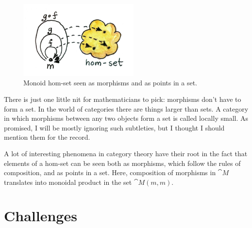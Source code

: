 \begin{figure}
\centering
\includegraphics[width=60mm]{images/monoidhomset.jpg}
\caption{Monoid hom-set seen as morphisms and as points in a set.}
\end{figure}

There is just one little nit for mathematicians to pick: morphisms don't
have to form a set. In the world of categories there are things larger
than sets. A category in which morphisms between any two objects form a
set is called locally small. As promised, I will be mostly ignoring such
subtleties, but I thought I should mention them for the record.

A lot of interesting phenomena in category theory have their root in the
fact that elements of a hom-set can be seen both as morphisms, which
follow the rules of composition, and as points in a set. Here,
composition of morphisms in $\cat{M}$ translates into monoidal product in the
set $\cat{M}(m, m)$.

\section{Challenges}

